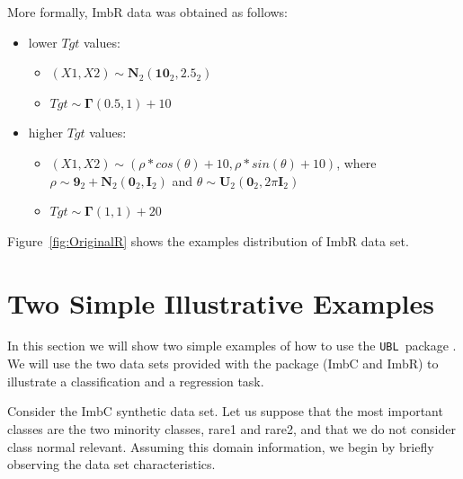 \documentclass[10pt,a4paper]{article}\usepackage[]{graphicx}\usepackage[]{color}
\newcommand{\UBLp}{\texttt{UBL}\ package  }
\begin{document}
More formally, ImbR data was obtained as follows:
\begin{itemize}
  \item lower $Tgt$ values:
  \begin{itemize}
    \item $(X1, X2) \sim \mathbf{N}_{2} (\mathbf{10}_{2}, \mathbf{2.5}_{2})$
    \item $Tgt \sim \mathbf{\Gamma} \left( 0.5, 1 \right) + 10$
  \end{itemize}
  \item higher $Tgt$ values: 
  \begin{itemize} 
    \item $(X1, X2) \sim \left(\rho * cos(\theta) + 10, \rho * sin(\theta) + 10 \right)$, where $\rho \sim \mathbf{9}_{2}+\mathbf{N}_{2} \left(\mathbf{0}_{2}, \mathbf{I}_{2} \right)$ and $\theta \sim \mathbf{U}_{2} \left( \mathbf{0}_{2}, 2\pi \mathbf{I}_{2} \right)$ 
    \item $Tgt \sim \mathbf{\Gamma} \left( 1,1 \right) + 20$
    \end{itemize}
\end{itemize}


Figure~\ref{fig:OriginalR} shows the examples distribution of ImbR data set.
\section{Two Simple Illustrative Examples}\label{sec:example}

In this section we will show two simple examples of how to use the \UBLp. We will use the two data sets provided with the package (ImbC and ImbR) to illustrate a classification and a regression task.


Consider the ImbC synthetic data set. Let us suppose that the most important classes are the two minority classes, rare1 and rare2, and that we do not consider class normal relevant. Assuming this domain information, we begin by briefly observing the data set characteristics.
\end{document}
